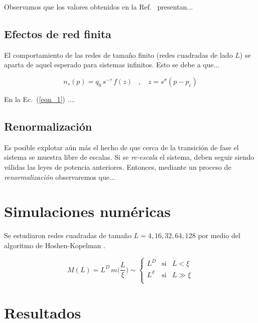 \documentclass[%
 reprint,
 amsmath,amssymb,
 aps,
spanish]{revtex4-1}
\begin{document}
Observamos que los valores obtenidos en la Ref.~\cite{Stauffer} presentan...



\subsection{\label{scaling}Efectos de red finita}

El comportamiento de las redes de tama\~no finito (redes cuadradas de lado $L$) se aparta de aquel esperado para sistemas infinitos. Esto se debe a que...


\begin{equation}
n_s(p)=q_0\,s^{-\tau}\,f(z)\ \ \ \ ,\ \ \ \ z=s^\sigma(p-p_c)\label{eqn_1}
\end{equation}

En la Ec.~(\ref{eqn_1}) ....

\subsection{\label{renorm}Renormalizaci\'on}

Es posible explotar a\'un m\'as el hecho de que cerca de la transici\'on de fase el sistema se muestra libre de escalas. Si se \emph{re-escala} el sistema, deben seguir siendo v\'alidas las leyes de potencia anteriores. Entonces, mediante un proceso de \emph{renormalizaci\'on} observaremos que...

\section{\label{simulations}Simulaciones num\'ericas}

Se estudiaron redes cuadradas de tama\~no $L=4, 16, 32, 64, 128$ por medio del algoritmo de Hoshen-Kopelman \cite{Kopelman}. 


\begin{equation}
M(L)=L^D\,m\bigg(\displaystyle\frac{L}{\xi}\bigg)\sim\left\{\begin{array}{lll}
             L^D       & \textrm{si} & L<\xi \\
             L^d       & \textrm{si} & L\gg\xi \\
            \end{array}\right.\label{eqn_2}
\end{equation}


\section{\label{results}Resultados}
\end{document}
